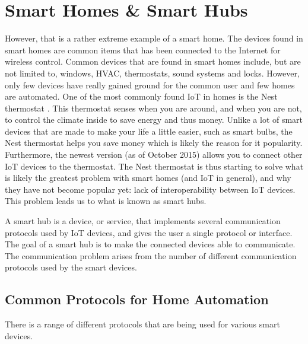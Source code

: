 \section{Smart Homes \& Smart Hubs}\label{sec:smarthomes}
However, that is a rather extreme example of a smart home. 
The devices found in smart homes are common items that has been connected to the Internet for wireless control.
Common devices that are found in smart homes include, but are not limited to, 
windows, HVAC, thermostats, sound systems and locks. 
However, only few devices have really gained ground for the common user and few homes are automated.
One of the most commonly found IoT in homes is the Nest thermostat \cite{NEST}. 
This thermostat senses when you are around, and when you are not, 
to control the climate inside to save energy and thus money.
Unlike a lot of smart devices that are made to make your life a little easier, such as smart bulbs,
the Nest thermostat helps you save money which is likely the reason for it popularity. 
Furthermore, the newest version (as of October 2015) allows you to connect other IoT devices to the thermostat. 
The Nest thermostat is thus starting to solve what is likely the greatest problem with smart homes (and IoT in general), 
and why they have not become popular yet: lack of interoperability between IoT devices. 
This problem leads us to what is known as smart hubs. 

A smart hub is a device, or service, that implements several communication protocols used by IoT devices, 
and gives the user a single protocol or interface. 
The goal of a smart hub is to make the connected devices able to communicate.
The communication problem arises from the number of different communication protocols used by the smart devices. 


\subsection{Common Protocols for Home Automation}
There is a range of different protocols that are being used for various smart devices. 


%    

